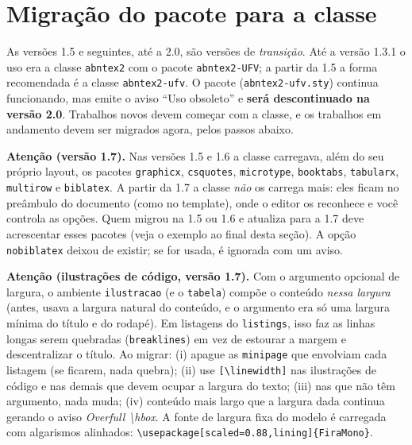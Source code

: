 \section{Migração do pacote para a classe}\label{sec:migracao}

As versões 1.5 e seguintes, até a 2.0, são versões de \emph{transição}. Até a versão 1.3.1
o uso era a classe \texttt{abntex2} com o pacote \texttt{abntex2-UFV}; a partir da 1.5 a forma
recomendada é a classe \texttt{abntex2-ufv}. O pacote (\texttt{abntex2-ufv.sty}) continua
funcionando, mas emite o aviso ``Uso obsoleto'' e \textbf{será descontinuado na versão 2.0}.
Trabalhos novos devem começar com a classe, e os trabalhos em andamento devem ser migrados
agora, pelos passos abaixo.

\textbf{Atenção (versão 1.7).} Nas versões 1.5 e 1.6 a classe carregava, além do seu próprio
layout, os pacotes \texttt{graphicx}, \texttt{csquotes}, \texttt{microtype},
\texttt{booktabs}, \texttt{tabularx}, \texttt{multirow} e \texttt{biblatex}. A partir da 1.7
a classe \emph{não} os carrega mais: eles ficam no preâmbulo do documento (como no template),
onde o editor os reconhece e você controla as opções. Quem migrou na 1.5 ou 1.6 e atualiza
para a 1.7 deve acrescentar esses pacotes (veja o exemplo ao final desta seção). A opção
\texttt{nobiblatex} deixou de existir; se for usada, é ignorada com um aviso.

\textbf{Atenção (ilustrações de código, versão 1.7).} Com o argumento opcional de largura, o
ambiente \texttt{ilustracao} (e o \texttt{tabela}) compõe o conteúdo \emph{nessa largura}
(antes, usava a largura natural do conteúdo, e o argumento era só uma largura mínima do título
e do rodapé). Em listagens do \texttt{listings}, isso faz as linhas longas serem quebradas
(\texttt{breaklines}) em vez de estourar a margem e descentralizar o título. Ao migrar:
(i) apague as \texttt{minipage} que envolviam cada listagem (se ficarem, nada quebra);
(ii) use \texttt{[\textbackslash linewidth]} nas ilustrações de código e nas demais que
devem ocupar a largura do texto; (iii) nas que não têm argumento, nada muda; (iv) conteúdo
mais largo que a largura dada continua gerando o aviso \emph{Overfull \textbackslash hbox}.
A fonte de largura fixa do modelo é carregada com algarismos alinhados:
\texttt{\textbackslash usepackage[scaled=0.88,lining]\{FiraMono\}}.

